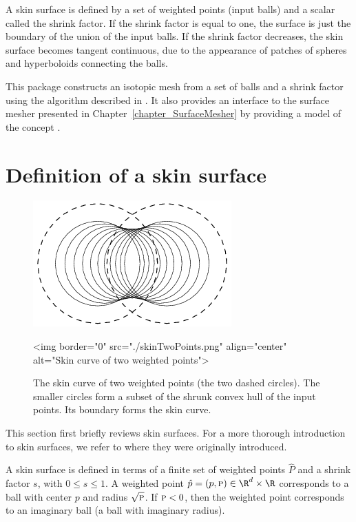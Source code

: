 A skin surface is defined by a set of weighted points (input balls)
and a scalar called the shrink factor. If the shrink factor is equal
to one, the surface is just the boundary of the union of the input
balls.  If the shrink factor decreases, the skin surface becomes
tangent continuous, due to the appearance of patches of spheres and
hyperboloids connecting the balls.

This package constructs an isotopic mesh from a set of balls and a
shrink factor using the algorithm described in
\cite{cgal:kv-mssct-05}. It also provides an interface to the surface
mesher presented in Chapter~\ref{chapter_SurfaceMesher} by providing a
model of the concept .

\section{Definition of a skin surface}
\label{sec:skindefinition}

\begin{figure}
  \begin{ccTexOnly}
    \begin{center}
      \includegraphics[width=.25\textwidth]{Skin_surface_3/skinTwoPoints}
    \end{center}
  \end{ccTexOnly}
  \begin{ccHtmlOnly}
    <img border="0" src="./skinTwoPoints.png" align="center" alt="Skin
    curve of two weighted points">
  \end{ccHtmlOnly}
  \caption{\label{fig:twoPoints} The skin curve of two weighted points
    (the two dashed circles). The smaller circles form a subset of the
    shrunk convex hull of the input points. Its boundary forms the skin
    curve. }
\end{figure}

This section first briefly reviews skin surfaces. For a more thorough
introduction to skin surfaces, we refer to \cite{cgal:e-dssd-99} where
they were originally introduced.

A skin surface is defined in terms of a finite set of weighted points
$\hat{P}$ and a shrink factor $s$, with $0\leq s\leq 1$. A weighted
point $\hat{p}=({p},\textsc{p})\in \R^d\times\R$ corresponds to a ball
with center ${p}$ and radius $\sqrt{\textsc{p}}$. If $\textsc{p}<0$,
then the weighted point corresponds to an imaginary ball (a ball with
imaginary radius).

